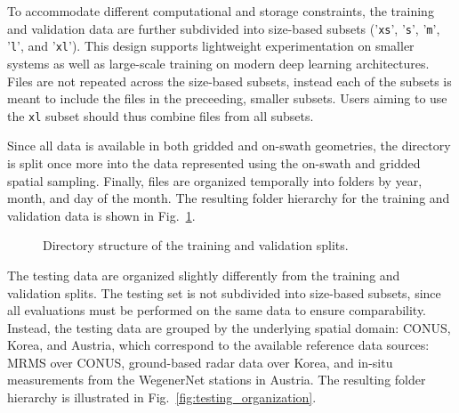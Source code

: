 \documentclass[11pt]{article}
\begin{document}
To accommodate different computational and storage constraints, the training and
validation data are further subdivided into size-based subsets ('\texttt{xs}',
'\texttt{s}', '\texttt{m}', '\texttt{l}', and '\texttt{xl}'). This design
supports lightweight experimentation on smaller systems as well as large-scale
training on modern deep learning architectures. Files are not repeated across
the size-based subsets, instead each of the subsets is meant to include the
files in the preceeding, smaller subsets. Users aiming to use the \texttt{xl}
subset should thus combine files from all subsets.

Since all data is available in both gridded and on-swath geometries, the
directory is split once more into the data represented using the on-swath and
gridded spatial sampling. Finally, files are organized temporally into folders
by year, month, and day of the month. The resulting folder hierarchy for the
training and validation data is shown in Fig.~\ref{fig:train_val_organization}.

\begin{figure}[hbpt!] %


	\caption{
		Directory structure of the training and validation splits.
	}
	\label{fig:train_val_organization}
\end{figure}

The testing data are organized slightly differently from the training and
validation splits. The testing set is not subdivided into size-based subsets,
since all evaluations must be performed on the same data to ensure
comparability. Instead, the testing data are grouped by the underlying spatial
domain: CONUS, Korea, and Austria, which correspond to the available reference
data sources: MRMS over CONUS, ground-based radar data over Korea, and in-situ
measurements from the WegenerNet stations in Austria. The resulting folder
hierarchy is illustrated in Fig.~\ref{fig:testing_organization}.
\end{document}
